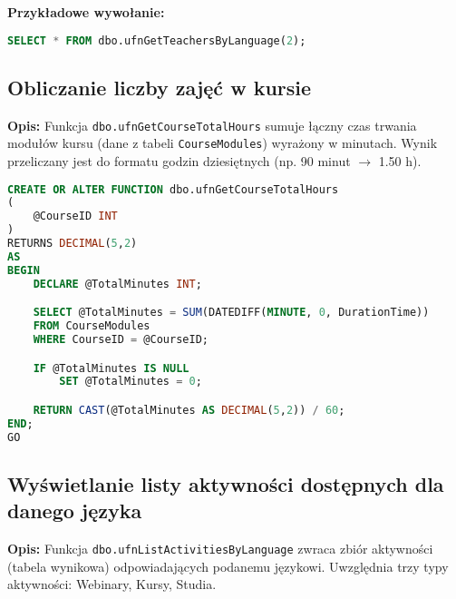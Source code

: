 \documentclass[12pt]{article}
\begin{document}
\textbf{Przykładowe wywołanie:}
\begin{lstlisting}[language=SQL]
SELECT * FROM dbo.ufnGetTeachersByLanguage(2);
\end{lstlisting}
\subsection{Obliczanie liczby zajęć w kursie}
\label{sec:course_total_hours}

\textbf{Opis:} Funkcja \texttt{dbo.ufnGetCourseTotalHours} sumuje łączny czas trwania modułów kursu (dane z tabeli \texttt{CourseModules}) wyrażony w minutach. Wynik przeliczany jest do formatu godzin dziesiętnych (np. 90 minut $\rightarrow$ 1.50 h).

 
\begin{lstlisting}[language=SQL]
CREATE OR ALTER FUNCTION dbo.ufnGetCourseTotalHours
(
    @CourseID INT
)
RETURNS DECIMAL(5,2)
AS
BEGIN
    DECLARE @TotalMinutes INT;

    SELECT @TotalMinutes = SUM(DATEDIFF(MINUTE, 0, DurationTime))
    FROM CourseModules
    WHERE CourseID = @CourseID;

    IF @TotalMinutes IS NULL
        SET @TotalMinutes = 0;

    RETURN CAST(@TotalMinutes AS DECIMAL(5,2)) / 60;
END;
GO
\end{lstlisting}
\newpage
\subsection{Wyświetlanie listy aktywności dostępnych dla danego języka}
\label{sec:activities_by_language}

\textbf{Opis:} Funkcja \texttt{dbo.ufnListActivitiesByLanguage} zwraca zbiór aktywności (tabela wynikowa) odpowiadających podanemu językowi. Uwzględnia trzy typy aktywności: Webinary, Kursy, Studia.
\end{document}
